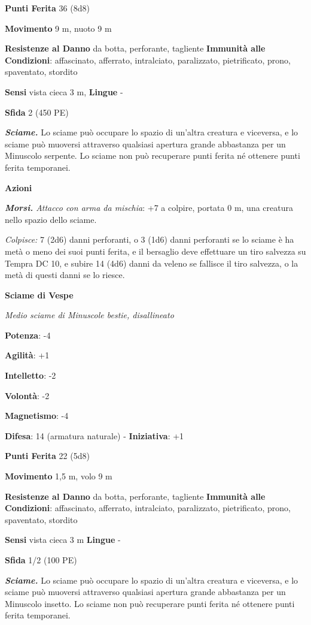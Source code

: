 \begin{multicols}{2}
\textbf{Punti Ferita} 36 (8d8)

\textbf{Movimento} 9 m, nuoto 9 m

\textbf{Resistenze al Danno} da botta, perforante, tagliente
\textbf{Immunità alle Condizioni}: affascinato, afferrato, intralciato,
paralizzato, pietrificato, prono, spaventato, stordito

\textbf{Sensi} vista cieca 3 m,  \textbf{Lingue} -

\textbf{Sfida} 2 (450 PE)\smallskip

\emph{\textbf{Sciame.}} Lo sciame può occupare lo spazio di un'altra
creatura e viceversa, e lo sciame può muoversi attraverso qualsiasi
apertura grande abbastanza per un Minuscolo serpente. Lo sciame non può
recuperare punti ferita né ottenere punti ferita temporanei.

\smallskip\textbf{Azioni}

\emph{\textbf{Morsi.} Attacco con arma da mischia}: +7 a colpire,
portata 0 m, una creatura nello spazio dello sciame.

\emph{Colpisce:} 7 (2d6) danni perforanti, o 3 (1d6) danni perforanti se
lo sciame è ha metà o meno dei suoi punti ferita, e il bersaglio deve
effettuare un tiro salvezza su Tempra DC 10, e subire 14 (4d6)
danni da veleno se fallisce il tiro salvezza, o la metà di questi danni
se lo riesce.

\textbf{Sciame di Vespe}

\emph{Medio sciame di Minuscole bestie, disallineato}

\textbf{Potenza}: -4

\textbf{Agilità}: +1

\textbf{Intelletto}: -2

\textbf{Volontà}: -2

\textbf{Magnetismo}: -4

\textbf{Difesa}: 14 (armatura naturale) - \textbf{Iniziativa}: +1

\textbf{Punti Ferita} 22 (5d8)

\textbf{Movimento} 1,5 m, volo 9 m

\textbf{Resistenze al Danno} da botta, perforante, tagliente
\textbf{Immunità alle Condizioni}: affascinato, afferrato, intralciato,
paralizzato, pietrificato, prono, spaventato, stordito

\textbf{Sensi} vista cieca 3 m \textbf{Lingue} -

\textbf{Sfida} 1/2 (100 PE)\smallskip

\emph{\textbf{Sciame.}} Lo sciame può occupare lo spazio di un'altra
creatura e viceversa, e lo sciame può muoversi attraverso qualsiasi
apertura grande abbastanza per un Minuscolo insetto. Lo sciame non può
recuperare punti ferita né ottenere punti ferita temporanei.


\end{multicols}
